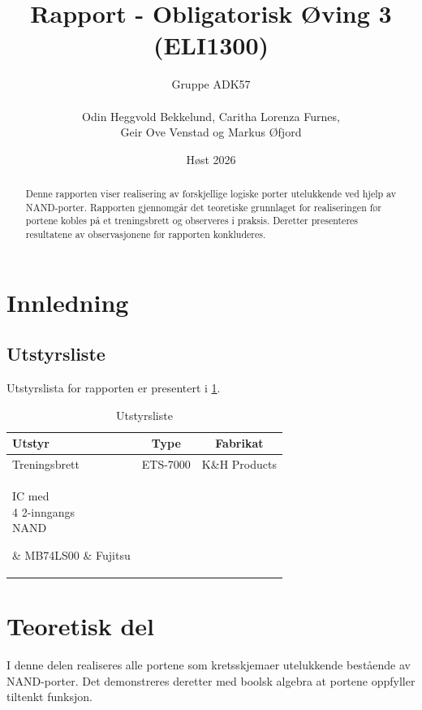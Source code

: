 \documentclass[11pt,a4paper,twocolumn]{article}
\title{Rapport - Obligatorisk Øving 3 (ELI1300)}
\author{
	Gruppe ADK57
	\\\\
	Odin Heggvold Bekkelund, Caritha Lorenza Furnes,
	\\
	Geir Ove Venstad og Markus Øfjord
}
\date{Høst 2026}
\begin{document}
\maketitle %

\begin{abstract}
Denne rapporten viser realisering av forskjellige logiske porter utelukkende ved hjelp av NAND-porter. Rapporten gjennomgår det teoretiske grunnlaget for realiseringen før portene kobles på et treningsbrett og observeres i praksis. Deretter presenteres resultatene av observasjonene før rapporten konkluderes.
\end{abstract}


\section{Innledning}

\subsection{Utstyrsliste}
Utstyrslista for rapporten er presentert i \cref{tab:utstyr}.

\begin{table}[h]
	\centering %
	\setlength{\belowcaptionskip}{6pt} %
	\setlength{\tabcolsep}{3pt} %

	\caption{Utstyrsliste}
	\label{tab:utstyr}

	\noindent
	\begin{tabular}{l|c|c} %
		\hline
		Utstyr & Type & Fabrikat \\
		\hline
		Treningsbrett & ETS-7000 & K\&H Products \\[3pt]
		\parbox[c]{2.2cm}{
		IC med \\ 4 2-inngangs \\ NAND
		} & MB74LS00 & Fujitsu \\[16pt]
		Ledninger & - & - \\
		\hline
	\end{tabular}
\end{table}

\section{Teoretisk del}
I denne delen realiseres alle portene som kretsskjemaer utelukkende bestående av NAND-porter. Det demonstreres deretter med boolsk algebra at portene oppfyller tiltenkt funksjon.
\end{document}
